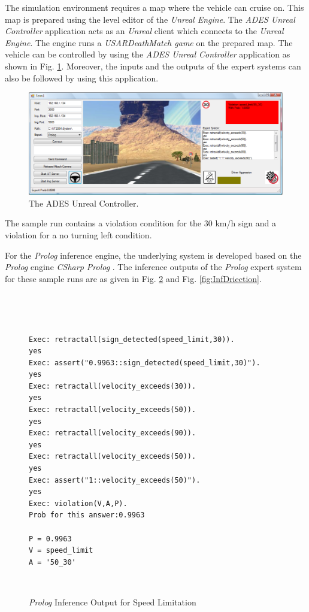 \documentclass[letterpaper, 10 pt, conference]{ieeeconf}
\newenvironment{mylisting}
{~\par~\begin{list}{}{\setlength{\leftmargin}{1em}}\item\scriptsize\bfseries}
{\end{list}~\par}
\begin{document}
The simulation environment requires a map where the vehicle can cruise on. This map is prepared using the level editor of the \textit{Unreal Engine}. The \textit{ADES Unreal Controller} application acts as an \textit{Unreal} client which connects to the \textit{Unreal Engine}. The engine runs a \textit{USARDeathMatch game} on the prepared map. The vehicle can be controlled by using the \textit{ADES Unreal Controller} application as shown in Fig. \ref{fig:ADESController}. Moreover, the inputs and the outputs of the expert systems can also be followed by using this application.

\begin{figure}[ht]
\begin{center}
\includegraphics[scale=0.22]{img/ADESController}
\caption{The ADES Unreal Controller.}
\label{fig:ADESController}
\end{center}
\end{figure}

The sample run contains a violation condition for the 30 km/h sign and a violation for a no turning left condition. 

For the \textit{Prolog} inference engine, the underlying system is developed based on the \textit{Prolog} engine \textit{CSharp Prolog} \cite{pool09}. The inference outputs of the \textit{Prolog} expert system for these sample runs are as given in Fig. \ref{fig:InfSpeed} and Fig. \ref{fig:InfDriection}.

\begin{figure}[thb]
      \centering
\begin{mylisting}

\begin{verbatim}
Exec: retractall(sign_detected(speed_limit,30)).
yes
Exec: assert("0.9963::sign_detected(speed_limit,30)").
yes
Exec: retractall(velocity_exceeds(30)).
yes
Exec: retractall(velocity_exceeds(50)).
yes
Exec: retractall(velocity_exceeds(90)).
yes
Exec: retractall(velocity_exceeds(50)).
yes
Exec: assert("1::velocity_exceeds(50)").
yes
Exec: violation(V,A,P).
Prob for this answer:0.9963

P = 0.9963
V = speed_limit
A = '50_30'
\end{verbatim}
\end{mylisting}
      \caption{\textit{Prolog} Inference Output for Speed Limitation}
      \label{fig:InfSpeed}
\end{figure}
\end{document}
